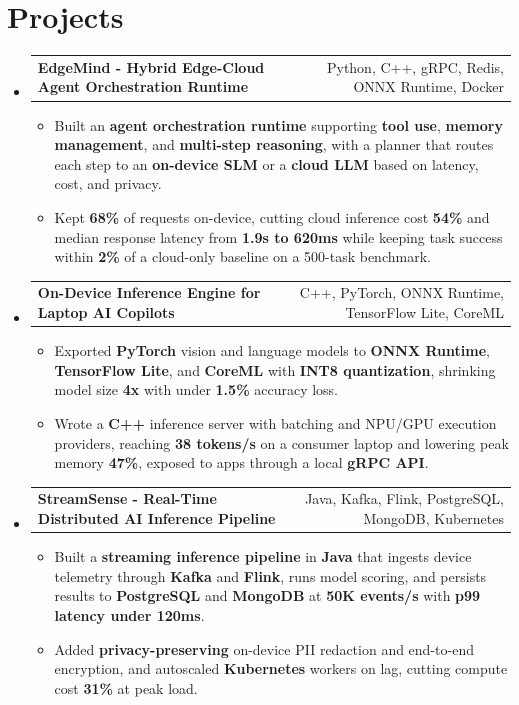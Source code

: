 \documentclass[letterpaper,10.5pt]{article}
\makeatletter
\newcommand{\resumeItem}[1]{\item\small{{#1 \vspace{-2.5pt}}}}
\newcommand{\resumeProjectHeading}[2]{
    \item
    \begin{tabular*}{0.98\textwidth}{l@{\extracolsep{\fill}}r}
      \small#1 & \small #2 \\
    \end{tabular*}\vspace{-6pt}
}
\newcommand{\sqbullet}{\raisebox{0.15ex}{\scriptsize$\blacksquare$}}
\newcommand{\resumeSubHeadingListStart}{\begin{itemize}[leftmargin=0.15in, label=\sqbullet]}
\newcommand{\resumeSubHeadingListEnd}{\end{itemize}}
\newcommand{\resumeItemListStart}{\begin{itemize}[leftmargin=0.2in, label=\textbf{-}]}
\newcommand{\resumeItemListEnd}{\end{itemize}\vspace{-4pt}}
\makeatother
\begin{document}
\section{Projects}
  \resumeSubHeadingListStart
    \resumeProjectHeading
      {\textbf{EdgeMind - Hybrid Edge-Cloud Agent Orchestration Runtime}}{Python, C++, gRPC, Redis, ONNX Runtime, Docker}
      \resumeItemListStart
        \resumeItem{Built an \textbf{agent orchestration runtime} supporting \textbf{tool use}, \textbf{memory management}, and \textbf{multi-step reasoning}, with a planner that routes each step to an \textbf{on-device SLM} or a \textbf{cloud LLM} based on latency, cost, and privacy.}
        \resumeItem{Kept \textbf{68\%} of requests on-device, cutting cloud inference cost \textbf{54\%} and median response latency from \textbf{1.9s to 620ms} while keeping task success within \textbf{2\%} of a cloud-only baseline on a 500-task benchmark.}
      \resumeItemListEnd
    \resumeProjectHeading
      {\textbf{On-Device Inference Engine for Laptop AI Copilots}}{C++, PyTorch, ONNX Runtime, TensorFlow Lite, CoreML}
      \resumeItemListStart
        \resumeItem{Exported \textbf{PyTorch} vision and language models to \textbf{ONNX Runtime}, \textbf{TensorFlow Lite}, and \textbf{CoreML} with \textbf{INT8 quantization}, shrinking model size \textbf{4x} with under \textbf{1.5\%} accuracy loss.}
        \resumeItem{Wrote a \textbf{C++} inference server with batching and NPU/GPU execution providers, reaching \textbf{38 tokens/s} on a consumer laptop and lowering peak memory \textbf{47\%}, exposed to apps through a local \textbf{gRPC API}.}
      \resumeItemListEnd
    \resumeProjectHeading
      {\textbf{StreamSense - Real-Time Distributed AI Inference Pipeline}}{Java, Kafka, Flink, PostgreSQL, MongoDB, Kubernetes}
      \resumeItemListStart
        \resumeItem{Built a \textbf{streaming inference pipeline} in \textbf{Java} that ingests device telemetry through \textbf{Kafka} and \textbf{Flink}, runs model scoring, and persists results to \textbf{PostgreSQL} and \textbf{MongoDB} at \textbf{50K events/s} with \textbf{p99 latency under 120ms}.}
        \resumeItem{Added \textbf{privacy-preserving} on-device PII redaction and end-to-end encryption, and autoscaled \textbf{Kubernetes} workers on lag, cutting compute cost \textbf{31\%} at peak load.}
      \resumeItemListEnd
  \resumeSubHeadingListEnd

\end{document}
